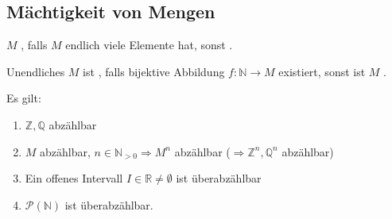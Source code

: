 \subsection*{Mächtigkeit von Mengen}
\begin{definition}
	$M$ , falls $M$ endlich viele Elemente hat, sonst .
	
	Unendliches $M$ ist , falls bijektive Abbildung $f:\mathbb{N}\rightarrow M$ existiert, sonst ist $M$ .
\end{definition}
\begin{proposition}
	Es gilt:
	\begin{enumerate}[label={\arabic*)}]
		\item $\mathbb{Z},\mathbb{Q}$ abzählbar
		\item $M$ abzählbar, $n\in\mathbb{N}_{>0} \Rightarrow M^n$ abzählbar ($\Rightarrow \mathbb{Z}^n, \mathbb{Q}^n$ abzählbar)
		\item Ein offenes Intervall $I\in\mathbb{R}\neq \emptyset $ ist überabzählbar
		\item $\mathcal{P}(\mathbb{N})$ ist überabzählbar.
	\end{enumerate}
\end{proposition}